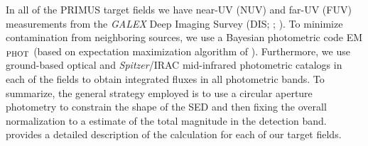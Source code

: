 \documentclass{emulateapj}
\begin{document}
In all of the PRIMUS target fields we have near-UV (NUV) and far-UV (FUV) measurements from the {\em GALEX} Deep Imaging Survey (DIS; \cite{Martin:2005aa}; \cite{Morrissey:2005aa}). 
To minimize contamination from neighboring sources, we use a Bayesian photometric code EM$_{\rm{PHOT}}$ (based on expectation maximization algorithm of \cite{Guillaume:2006aa}). 
Furthermore, we use ground-based optical and {\em Spitzer}/IRAC mid-infrared photometric catalogs in each of the fields to obtain integrated fluxes in all 
photometric bands.
To summarize, the general strategy employed is to use a circular aperture photometry to constrain the shape of the SED and then fixing the overall normalization to 
a estimate of the total magnitude in the detection band. 
\cite{Moustakas:2013aa} provides a detailed description of the calculation for each of our target fields.  
\end{document}
